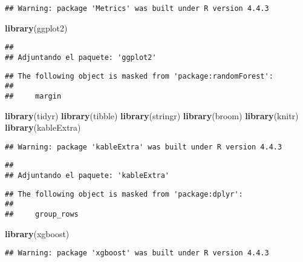 \documentclass[
]{article}
\newenvironment{Shaded}{\begin{snugshade}}{\end{snugshade}}
\newcommand{\FunctionTok}[1]{\textcolor[rgb]{0.13,0.29,0.53}{\textbf{#1}}}
\newcommand{\NormalTok}[1]{#1}
\begin{document}
\begin{verbatim}
## Warning: package 'Metrics' was built under R version 4.4.3
\end{verbatim}

\begin{Shaded}
\begin{Highlighting}[]
\FunctionTok{library}\NormalTok{(ggplot2)}
\end{Highlighting}
\end{Shaded}

\begin{verbatim}
## 
## Adjuntando el paquete: 'ggplot2'
\end{verbatim}

\begin{verbatim}
## The following object is masked from 'package:randomForest':
## 
##     margin
\end{verbatim}

\begin{Shaded}
\begin{Highlighting}[]
\FunctionTok{library}\NormalTok{(tidyr)}
\FunctionTok{library}\NormalTok{(tibble)}
\FunctionTok{library}\NormalTok{(stringr)}
\FunctionTok{library}\NormalTok{(broom)}
\FunctionTok{library}\NormalTok{(knitr)}
\FunctionTok{library}\NormalTok{(kableExtra)}
\end{Highlighting}
\end{Shaded}

\begin{verbatim}
## Warning: package 'kableExtra' was built under R version 4.4.3
\end{verbatim}

\begin{verbatim}
## 
## Adjuntando el paquete: 'kableExtra'
\end{verbatim}

\begin{verbatim}
## The following object is masked from 'package:dplyr':
## 
##     group_rows
\end{verbatim}

\begin{Shaded}
\begin{Highlighting}[]
\FunctionTok{library}\NormalTok{(xgboost)}
\end{Highlighting}
\end{Shaded}

\begin{verbatim}
## Warning: package 'xgboost' was built under R version 4.4.3
\end{verbatim}
\end{document}
